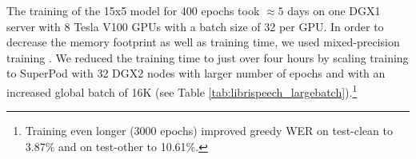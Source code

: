 \documentclass{article}
\begin{document}
\begin{table}[thb]
\centering
\caption{LibriSpeech results, WER ($\%$)}
\vspace{4pt}
\label{tab:LibriSpeech}
\end{table}
The training of the 15x5 model for 400 epochs
took $\approx 5$ days on one DGX1 server with 8 Tesla V100 GPUs with a batch size of 32 per GPU.  In order to  decrease the memory footprint as well as training time, we used mixed-precision training  \cite{micikevicius2017mixed}. We reduced the training time to just over four hours  by scaling training to SuperPod with 32 DGX2 nodes with larger number of epochs and with an increased global batch of 16K (see Table \ref{tab:librispeech_largebatch}).\footnote{Training even longer (3000 epochs) improved greedy WER on test-clean to 3.87\% and on test-other to  10.61\%.}
\end{document}
